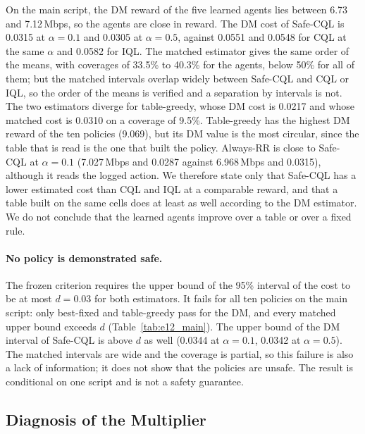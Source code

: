 On the main script, the DM reward of the five learned agents lies between 6.73 and 7.12\,Mbps, so the agents are close in reward.%
The DM cost of Safe-CQL is 0.0315 at $\alpha=0.1$ and 0.0305 at $\alpha=0.5$, against 0.0551 and 0.0548 for CQL at the same $\alpha$ and 0.0582 for IQL.%
The matched estimator gives the same order of the means, with coverages of 33.5\% to 40.3\% for the agents, below 50\% for all of them; but the matched intervals overlap widely between Safe-CQL and CQL or IQL, so the order of the means is verified and a separation by intervals is not.%
The two estimators diverge for table-greedy, whose DM cost is 0.0217 and whose matched cost is 0.0310 on a coverage of 9.5\%.%
Table-greedy has the highest DM reward of the ten policies (9.069), but its DM value is the most circular, since the table that is read is the one that built the policy.%
Always-RR is close to Safe-CQL at $\alpha=0.1$ (7.027\,Mbps and 0.0287 against 6.968\,Mbps and 0.0315), although it reads the logged action.%
We therefore state only that Safe-CQL has a lower estimated cost than CQL and IQL at a comparable reward, and that a table built on the same cells does at least as well according to the DM estimator.%
We do not conclude that the learned agents improve over a table or over a fixed rule.%

\paragraph{No policy is demonstrated safe.}
The frozen criterion requires the upper bound of the 95\% interval of the cost to be at most $d=0.03$ for both estimators.%
It fails for all ten policies on the main script: only best-fixed and table-greedy pass for the DM, and every matched upper bound exceeds $d$ (Table~\ref{tab:e12_main}).%
The upper bound of the DM interval of Safe-CQL is above $d$ as well (0.0344 at $\alpha=0.1$, 0.0342 at $\alpha=0.5$).%
The matched intervals are wide and the coverage is partial, so this failure is also a lack of information; it does not show that the policies are unsafe.%
The result is conditional on one script and is not a safety guarantee.%

\subsection{Diagnosis of the Multiplier}
\label{sec:res_lambda}

